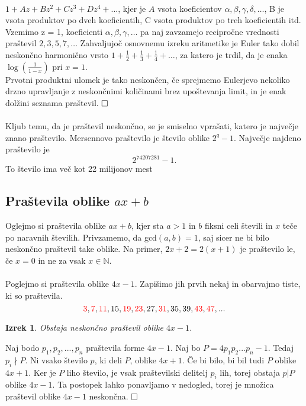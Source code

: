 \documentclass[a4paper,12pt]{article}
\def\qed{$\hfill\Box$}   %
\newtheorem{izrek}{Izrek}
\begin{document}
	\\
	$1+Az+Bz^2+Cz^3+Dz^4+ ...$, kjer je $A$ vsota koeficientov $\alpha, \beta, \gamma, \delta, \ldots$, B je
	vsota produktov po dveh koeficientih, C vsota produktov po treh koeficientih
	itd.
	\\
	Vzemimo z = 1, koeficienti $\alpha, \beta, \gamma, \ldots $ pa naj zavzamejo recipročne vrednosti
	praštevil $2, 3, 5, 7,\ldots$ Zahvaljujoč osnovnemu izreku aritmetike je Euler tako
	dobil neskončno harmonično vrsto $1 + \frac{1}{2} + \frac{1}{3} + \frac{1}{4} + \ldots$, za katero je trdil, da je
	enaka $\log(\frac{1}{1-x})$ pri $x = 1$.
	\\
	Prvotni produktni ulomek je tako neskončen, če sprejmemo Eulerjevo nekoliko
	drzno upravljanje z neskončnimi količinami brez upoštevanja limit, in je enak
	dolžini seznama praštevil.
\qed
\\
\\
Kljub temu, da je praštevil neskončno, se je smiselno vprašati, katero je največje
znano praštevilo. Mersennovo praštevilo je število oblike $2^q-1$. Največje najdeno praštevilo je 
$$ 2^{74207281}-1.$$
To število ima več kot 22 milijonov mest

\subsection{Praštevila oblike $ax+b$}

Oglejmo si praštevila oblike $ax + b$, kjer sta $a > 1$ in $b$ fiksni celi števili in $x$
teče po naravnih številih. Privzamemo, da gcd$(a, b) = 1$, saj sicer ne bi bilo
neskončno praštevil take oblike. Na primer, $2x + 2 = 2(x + 1)$ je praštevilo le,
če $x = 0$ in ne za vsak $x \in \mathbb{N}$.
\\
\\
Poglejmo si praštevila oblike $4x-1$. Zapišimo jih prvih nekaj in obarvajmo
tiste, ki so praštevila.
$$ \textcolor{red}{3}, \textcolor{red}{7}, \textcolor{red}{11}, 15, \textcolor{red}{19}, \textcolor{red}{23}, 27, \textcolor{red}{31}, 35, 39, \textcolor{red}{43}, \textcolor{red}{47},...$$

\begin{izrek}
	Obstaja neskončno praštevil oblike  $4x-1$.
\end{izrek}

	Naj bodo $p_1, p_2, ..., p_n$ praštevila forme $4x-1$. Naj bo
	$P = 4p_1p_2...p_n-1$. Tedaj $p_i \nmid P$. Ni vsako število $p$, ki deli $P$, oblike $4x + 1$.
	Če bi bilo, bi bil tudi $P$ oblike $4x + 1$. Ker je $P$ liho število, je vsak
	praštevilski delitelj $p_i$ lih, torej obstaja $p|P$ oblike $4x-1$. Ta postopek lahko
	ponavljamo v nedogled, torej je množica praštevil oblike $4x-1$ neskončna.
\qed
	
\end{document}
